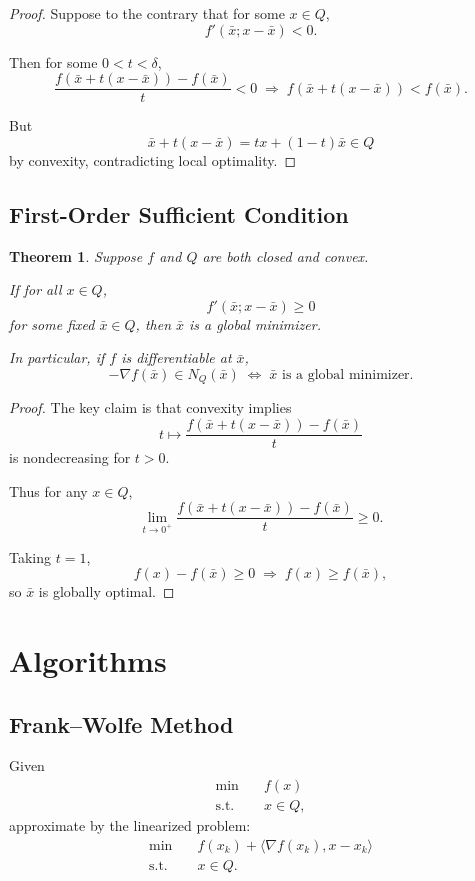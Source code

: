 \documentclass[12pt,oneside]{book}
\numberwithin{equation}{section}
\theoremstyle{definition}
\theoremstyle{plain}
\newtheorem{theorem}{Theorem}[section]
\theoremstyle{remark}
\begin{document}
\begin{proof}
Suppose to the contrary that for some $x \in Q$,
\[
f'(\bar{x}; x - \bar{x}) < 0.
\]

Then for some $0 < t < \delta$,
\[
\frac{f(\bar{x} + t(x - \bar{x})) - f(\bar{x})}{t} < 0
\;\Rightarrow\;
f(\bar{x} + t(x - \bar{x})) < f(\bar{x}).
\]

But
\[
\bar{x} + t(x - \bar{x}) = t x + (1-t)\bar{x} \in Q
\]
by convexity, contradicting local optimality.
\end{proof}

\subsection{First-Order Sufficient Condition}

\begin{theorem}
Suppose $f$ and $Q$ are both closed and convex.

If for all $x \in Q$,
\[
f'(\bar{x}; x - \bar{x}) \ge 0
\]
for some fixed $\bar{x} \in Q$, then $\bar{x}$ is a global minimizer.

In particular, if $f$ is differentiable at $\bar{x}$,
\[
-\nabla f(\bar{x}) \in N_Q(\bar{x})
\;\Longleftrightarrow\;
\bar{x} \text{ is a global minimizer.}
\]
\end{theorem}

\begin{proof}
The key claim is that convexity implies
\[
t \mapsto \frac{f(\bar{x} + t(x - \bar{x})) - f(\bar{x})}{t}
\]
is nondecreasing for $t > 0$.

Thus for any $x \in Q$,
\[
\lim_{t \to 0^+}
\frac{f(\bar{x} + t(x - \bar{x})) - f(\bar{x})}{t}
\ge 0.
\]

Taking $t = 1$,
\[
f(x) - f(\bar{x}) \ge 0
\;\Rightarrow\;
f(x) \ge f(\bar{x}),
\]
so $\bar{x}$ is globally optimal.
\end{proof}

\section{Algorithms}

\subsection{Frank--Wolfe Method}

Given
\[
\begin{aligned}
\min \quad & f(x) \\
\text{s.t.} \quad & x \in Q,
\end{aligned}
\]
approximate by the linearized problem:
\[
\begin{aligned}
\min \quad & f(x_k) + \langle \nabla f(x_k), x - x_k \rangle \\
\text{s.t.} \quad & x \in Q.
\end{aligned}
\]
\end{document}
